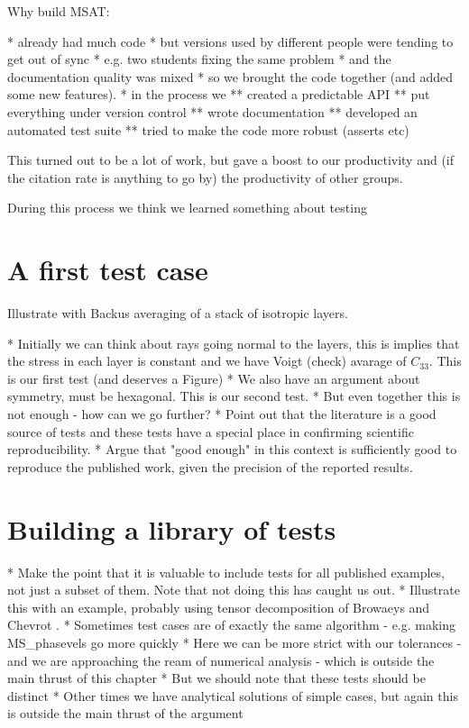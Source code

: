 \documentclass[11pt, oneside]{article}   	%
\begin{document}
Why build MSAT:

* already had much code
* but versions used by different people were tending to get out of sync
* e.g. two students fixing the same problem
* and the documentation quality was mixed
* so we brought the code together (and added some new features).
* in the process we
** created a predictable API
** put everything under version control
** wrote documentation
** developed an automated test suite
** tried to make the code more robust (asserts etc)

This turned out to be a lot of work, but gave a boost to our productivity and 
(if the citation rate is anything to go by) the productivity of other groups.

During this process we think we learned something about testing

\section{A first test case}

Illustrate with Backus averaging of a stack of isotropic layers.

* Initially we can think about rays going normal to the layers, this is 
implies that the stress in each layer is constant and we have Voigt (check)
avarage of $C_{33}$. This is our first test (and deserves a Figure)
* We also have an argument about symmetry, must be hexagonal. This is our
second test.
* But even together this is not enough - how can we go further?
* Point out that the literature is a good source of tests and these
tests have a special place in confirming scientific reproducibility.
* Argue that "good enough" in this context is sufficiently good to 
reproduce the published work, given the precision of the reported results.

\section{Building a library of tests}

* Make the point that it is valuable to include tests for all published
examples, not just a subset of them. Note that not doing this has caught
us out. 
* Illustrate this with an example, probably using tensor decomposition 
of Browaeys and Chevrot \cite{Browaeys2004}.
* Sometimes test cases are of exactly the same algorithm - e.g. making
MS\_phasevels go more quickly
* Here we can be more strict with our tolerances - and we are approaching 
the ream of numerical analysis - which is outside the main thrust of this chapter
* But we should note that these tests should be distinct
* Other times we have analytical solutions of simple cases, but again this is 
outside the main thrust of the argument
\end{document}
